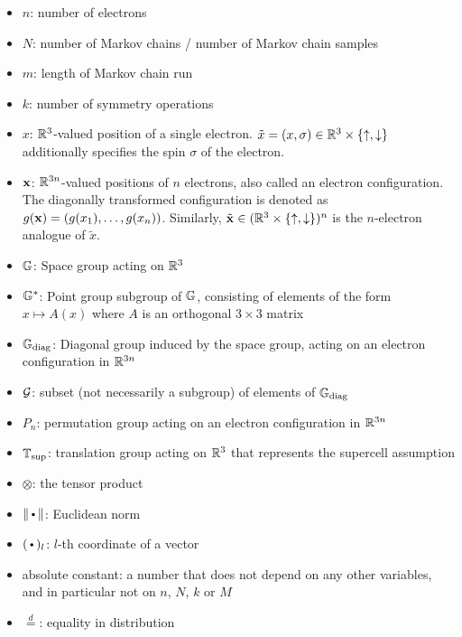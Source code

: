 \begin{itemize}
    \item $n$: number of electrons 
    \item $N$: number of Markov chains / number of Markov chain samples 
    \item $m$: length of Markov chain run
    \item $k$: number of symmetry operations
    \item $x$: $\mathbb{R}^3$-valued position of a single electron. $\tilde x = (x, \sigma) \in \mathbb{R}^3 \times \{\uparrow, \downarrow\}$ additionally specifies the spin $\sigma$ of the electron.
    \item $\mathbf{x}$: $\mathbb{R}^{3n}$-valued positions of $n$ electrons, also called an electron configuration. The diagonally transformed configuration is denoted as $g(\mathbf{x}) = (g(x_1), \ldots, g(x_n))$. Similarly, $\tilde {\mathbf{x}} \in (\mathbb{R}^3 \times \{\uparrow, \downarrow\})^n$ is the $n$-electron analogue of $\tilde x$. 
    \item $\mathbb{G}$: Space group acting on $\mathbb{R}^3$
    \item $\mathbb{G}^*$: Point group subgroup of $\mathbb{G}$, consisting of elements of the form $x \mapsto A(x)$ where $A$ is an orthogonal $3 \times 3$ matrix
    \item $\mathbb{G}_{\text{\rm diag}}$: Diagonal group induced by the space group, acting on an electron configuration in $\mathbb{R}^{3n}$
    \item $\mathcal{G}$: subset (not necessarily a subgroup) of elements of $\mathbb{G}_{\text{\rm diag}}$
    \item $P_n$: permutation group acting on an electron configuration in $\mathbb{R}^{3n}$
    \item $\mathbb{T}_{\rm sup}$: translation group acting on $\mathbb{R}^3$ that represents the supercell assumption
    \item $\otimes$: the tensor product
    \item $\| \argdot \|$: Euclidean norm
    \item $(\argdot)_l$: $l$-th coordinate of a vector
    \item absolute constant: a number that does not depend on any other variables, and in particular not on $n$, $N$, $k$ or $M$
    \item $\overset{d}{=}$: equality in distribution
\end{itemize}












